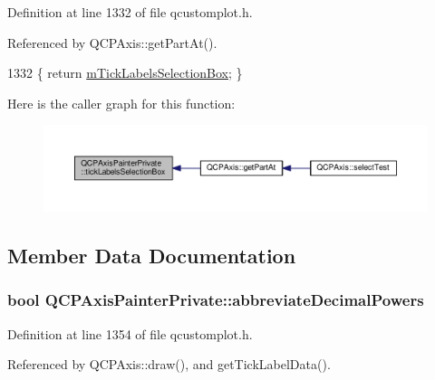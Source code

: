 Definition at line 1332 of file qcustomplot.\+h.



Referenced by Q\+C\+P\+Axis\+::get\+Part\+At().


\begin{DoxyCode}
1332 \{ \textcolor{keywordflow}{return} \hyperlink{class_q_c_p_axis_painter_private_a0adaf5f1d89be0f32dc4a904d157e5a9}{mTickLabelsSelectionBox}; \}
\end{DoxyCode}


Here is the caller graph for this function\+:\nopagebreak
\begin{figure}[H]
\begin{center}
\leavevmode
\includegraphics[width=350pt]{class_q_c_p_axis_painter_private_af02fc189ab8460c202eb4138c9aca516_icgraph}
\end{center}
\end{figure}




\subsection{Member Data Documentation}
\hypertarget{class_q_c_p_axis_painter_private_a68353c2eeabd00d96a2e36a0b3809cb2}{}
\subsubsection[{abbreviate\+Decimal\+Powers}]{\setlength{\rightskip}{0pt plus 5cm}bool Q\+C\+P\+Axis\+Painter\+Private\+::abbreviate\+Decimal\+Powers}\label{class_q_c_p_axis_painter_private_a68353c2eeabd00d96a2e36a0b3809cb2}


Definition at line 1354 of file qcustomplot.\+h.



Referenced by Q\+C\+P\+Axis\+::draw(), and get\+Tick\+Label\+Data().

\hypertarget{class_q_c_p_axis_painter_private_afcd55b0e1ecd689fffd2b1fc75dc7732}{}

